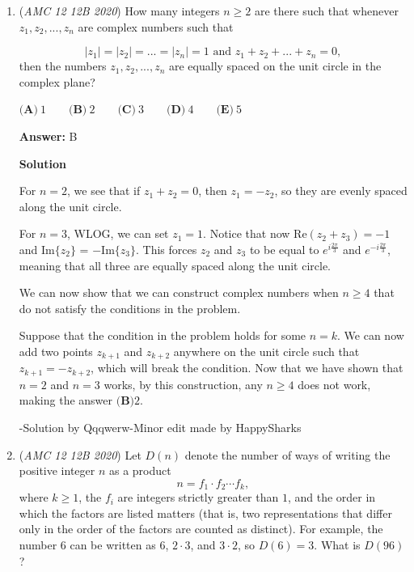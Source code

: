 \begin{enumerate}
 


 Note: $\frac{t}{2^t}=\frac{1}{6}$ is possible as $\frac{t}{2^t}$ is continuous and that $\frac{0}{2^0}=0$ and $\frac{2}{2^2}=\frac{1}{2}$ so by the Intermediate Value Theorem (or just by intuition), there must be a $t$ between $0$ and $2$ that satisfies $\frac{t}{2^t}=\frac{1}{6}.$

 -MistyMathMusic

 


	\item (\textit{AMC 12 12B 2020}) How many integers $n \geq 2$ are there such that whenever $z_1, z_2, ..., z_n$ are complex numbers such that


 
 \[|z_1| = |z_2| = ... = |z_n| = 1 \text{    and    } z_1 + z_2 + ... + z_n = 0,\]
then the numbers $z_1, z_2, ..., z_n$ are equally spaced on the unit circle in the complex plane?


 $\textbf{(A)}\ 1 \qquad\textbf{(B)}\ 2 \qquad\textbf{(C)}\ 3 \qquad\textbf{(D)}\ 4 \qquad\textbf{(E)}\ 5$

 \textbf{Answer: }B



\textbf{Solution}

For $n=2$, we see that if $z_{1}+z_{2}=0$, then $z_{1}=-z_{2}$, so they are evenly spaced along the unit circle.

 For $n=3$, WLOG, we can set $z_{1}=1$. Notice that now Re$(z_{2}+z_{3})=-1$ and Im$\{z_{2}\}$ = $-$Im$\{z_{3}\}$. This forces $z_{2}$ and $z_{3}$ to be equal to $e^{i\frac{2\pi}{3}}$ and $e^{-i\frac{2\pi}{3}}$, meaning that all three are equally spaced along the unit circle.

 We can now show that we can construct complex numbers when $n\geq 4$ that do not satisfy the conditions in the problem.

 Suppose that the condition in the problem holds for some $n=k$. We can now add two points $z_{k+1}$ and $z_{k+2}$ anywhere on the unit circle such that $z_{k+1}=-z_{k+2}$, which will break the condition. Now that we have shown that $n=2$ and $n=3$ works, by this construction, any $n\geq 4$ does not work, making the answer $\boxed{\textbf{(B)} 2}$.

 -Solution by Qqqwerw-Minor edit made by HappySharks

 


	\item (\textit{AMC 12 12B 2020}) Let $D(n)$ denote the number of ways of writing the positive integer $n$ as a product
 \[n = f_1\cdot f_2\cdots f_k,\]where $k\ge1$, the $f_i$ are integers strictly greater than $1$, and the order in which the factors are listed matters (that is, two representations that differ only in the order of the factors are counted as distinct). For example, the number $6$ can be written as $6$, $2\cdot 3$, and $3\cdot2$, so $D(6) = 3$. What is $D(96)$?



\end{enumerate}
